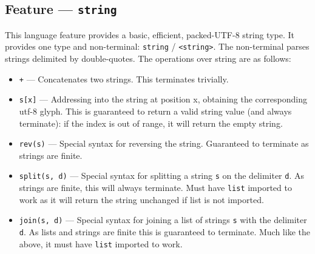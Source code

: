 

\subsection{Feature --- \texttt{string}} %
\label{sub:feature_string}
This language feature provides a basic, efficient, packed-UTF-8 string type. 
It provides one type and non-terminal: \texttt{string} / \texttt{<string>}.
The non-terminal parses strings delimited by double-quotes. 
The operations over string are as follows:
\begin{itemize}
    \item \texttt{+} --- Concatenates two strings. 
    This terminates trivially.
    \item \texttt{s[x]} --- Addressing into the string at position x, obtaining the corresponding utf-8 glyph.
    This is guaranteed to return a valid string value (and always terminate): if the index is out of range, it will return the empty string.
    \item \texttt{rev(s)} --- Special syntax for reversing the string.
    Guaranteed to terminate as strings are finite.
    \item \texttt{split(s, d)} --- Special syntax for splitting a string \texttt{s} on the delimiter \texttt{d}. 
    As strings are finite, this will always terminate.
    Must have \texttt{list} imported to work as it will return the string unchanged if list is not imported. 
    \item \texttt{join(s, d)} --- Special syntax for joining a list of strings \texttt{s} with the delimiter \texttt{d}.
    As lists and strings are finite this is guaranteed to terminate.
    Much like the above, it must have \texttt{list} imported to work. 
\end{itemize}


